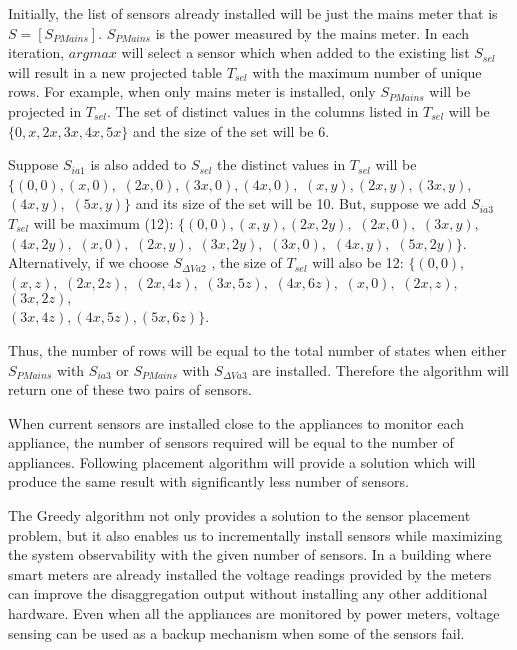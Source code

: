 Initially, the list of sensors already installed will be just the mains meter that is $S = [S_{PMains}]$.
$S_{PMains}$ is the power measured by the mains meter.
In each iteration, $argmax$ will select a sensor which when added to the existing list $S_{sel}$ will result in a new projected table $T_{sel}$ with the maximum number of unique rows.
For example, when only mains meter is installed, only $S_{PMains}$ will be projected in $T_{sel}$.
The set of distinct values in the columns listed  in $T_{sel}$ will be $\{0,x,2x,3x,4x,5x\}$ and the size of the set will be 6.

Suppose $S_{ia1}$ is also added to $S_{sel}$ the distinct values in $T_{sel}$ will be $\{(0,0),(x,0),$ $ (2x,0),(3x,0),(4x,0),$ $ (x,y),(2x,y),(3x,y),$
$(4x,y),$ $(5x,y)\}$ and its size of the set will be 10.
But, suppose we add $S_{ia3}$
 $T_{sel}$ will be maximum (12): $\{(0,0), (x,y), (2x,2y),$ $ (2x,0),$ $ (3x,y),$ $ (4x,2y),$ $ (x,0),$ $(2x,y),$ $ (3x,2y),$ $ (3x,0),$ $(4x,y),$ $ (5x,2y)\}$.
 Alternatively, if  we choose  $S_{\Delta Va2}$ ,
 the size of $T_{sel}$ will also be 12: $\{(0,0),$ $(x,z),$ $ (2x,2z),$ $ (2x,4z),$ $(3x,5z),$ $(4x,6z),$ $(x,0),$ $(2x,z),$ $(3x,2z),$ \\$(3x,4z),(4x,5z),(5x,6z)\}$.

Thus, the number of rows will be equal to the total number of states when either $S_{PMains}$ with $S_{ia3}$ or $S_{PMains}$ with $S_{\Delta Va3}$ are installed. Therefore the algorithm will return one of these two pairs of sensors.

When current sensors are installed close to the appliances to monitor each appliance, the number of sensors required will be equal to the number of appliances. Following placement algorithm will provide a solution which will produce the same result with significantly less number of sensors.

The Greedy algorithm not only provides a solution to the sensor placement problem, but it also enables us to incrementally install sensors while maximizing the system observability with the given number of sensors. In a building where smart meters are already installed the voltage readings provided by the meters can improve the disaggregation output without installing any other additional hardware. Even when all the appliances are monitored by power meters, voltage sensing can be used as a backup mechanism when some of the sensors fail.
